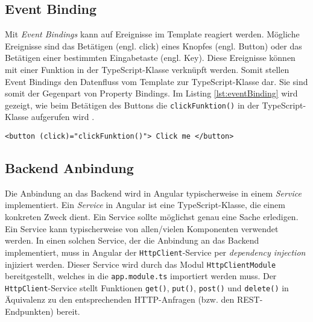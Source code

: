\subsection{Event Binding}\label{subsec:eventBinding}

Mit \textit{Event Bindings} kann auf Ereignisse im Template reagiert werden. Mögliche Ereignisse sind das Betätigen (engl. click) eines Knopfes (engl. Button) oder das Betätigen einer bestimmten Eingabetaste (engl. Key). 
Diese Ereignisse können mit einer Funktion in der TypeScript-Klasse verknüpft werden. Somit stellen Event Bindings den Datenfluss vom Template zur TypeScript-Klasse dar. Sie sind somit der Gegenpart von Property Bindings. 
Im Listing \ref{lst:eventBinding} wird gezeigt, wie beim Betätigen des Buttons die \texttt{clickFunktion()} in der TypeScript-Klasse aufgerufen wird \cite{Book2020}\cite{eventBinding2021}.

\begin{lstlisting}[caption=Event Binding, label=lst:eventBinding]
    <button (click)="clickFunktion()"> Click me </button>
\end{lstlisting}

\subsection{Backend Anbindung}

Die Anbindung an das Backend wird in Angular typischerweise in einem \textit{Service} implementiert. Ein \textit{Service} in Angular ist eine TypeScript-Klasse, die einem konkreten Zweck dient. Ein Service sollte möglichst genau eine Sache erledigen. Ein Service kann typischerweise von allen/vielen Komponenten verwendet werden. In einen solchen Service, der die Anbindung an das Backend implementiert, muss in Angular der \texttt{HttpClient}-Service per \textit{dependency injection} injiziert werden. Dieser Service wird durch das Modul \texttt{HttpClientModule} bereitgestellt, welches in die \texttt{app.module.ts} importiert werden muss. Der \texttt{HttpClient}-Service stellt Funktionen \texttt{get()}, \texttt{put()}, \texttt{post()} und \texttt{delete()} in Äquivalenz zu den entsprechenden HTTP-Anfragen (bzw. den REST-Endpunkten) bereit.